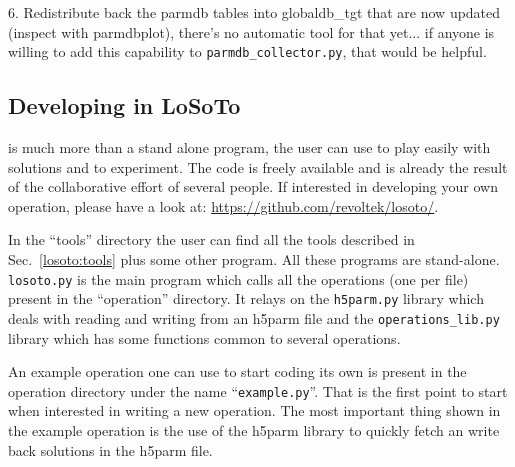 \documentclass[structabstract]{article}
\begin{document}
6. Redistribute back the parmdb tables into globaldb\_tgt that are now updated (inspect with parmdbplot), there's no automatic tool for that yet... if anyone is willing to add this capability to \texttt{parmdb\_collector.py}, that would be helpful.

\subsection{Developing in LoSoTo}
\label{losoto:developing}
\losoto{} is much more than a stand alone program, the user can use \losoto{} to play easily with solutions and to experiment. The code is freely available and is already the result of the collaborative effort of several people. If interested in developing your own operation, please have a look at: \url{https://github.com/revoltek/losoto/}.

In the ``tools'' directory the user can find all the tools described in Sec.~\ref{losoto:tools} plus some other program. All these programs are stand-alone. \texttt{losoto.py} is the main program which calls all the operations (one per file) present in the ``operation'' directory. It relays on the \texttt{h5parm.py} library which deals with reading and writing from an h5parm file and the \texttt{operations\_lib.py} library which has some functions common to several operations.

An example operation one can use to start coding its own is present in the operation directory under the name ``\texttt{example.py}''. That is the first point to start when interested in writing a new operation. The most important thing shown in the example operation is the use of the h5parm library to quickly fetch an write back solutions in the h5parm file.
\end{document}
